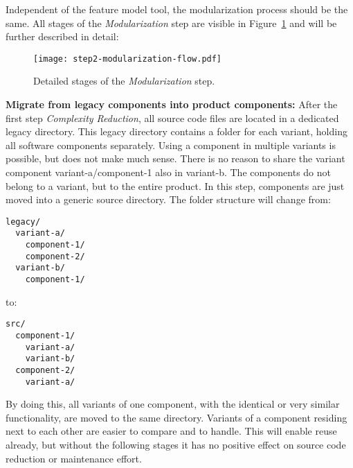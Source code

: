 Independent of the feature model tool, the modularization process should be the same.
All stages of the \textit{Modularization} step are visible in
Figure~\ref{fig:step2Modularization} and will be further described in detail:

\begin{figure}
  \centering
  \texttt{[image: step2-modularization-flow.pdf]}
  \caption{Detailed stages of the \textit{Modularization} step.}
  \label{fig:step2Modularization}
\end{figure}

\textbf{Migrate from legacy components into product components:} After the first
step \textit{Complexity Reduction}, all source code files are located in a
dedicated legacy directory. This legacy directory contains a folder for each
variant, holding all software components separately. Using a component in
multiple variants is possible, but does not make much sense. There is no reason
to share the variant component variant-a/component-1 also in variant-b. The
components do not belong to a variant, but to the entire product. In this step,
components are just moved into a generic source directory. The folder structure
will change from:
\begin{Verbatim}[frame=single,samepage=true]
legacy/
  variant-a/
    component-1/
    component-2/
  variant-b/
    component-1/
\end{Verbatim}
to:
\begin{Verbatim}[frame=single,samepage=true]
src/
  component-1/
    variant-a/
    variant-b/
  component-2/
    variant-a/
\end{Verbatim}
By doing this, all variants of one component, with the identical or very similar
functionality, are moved to the same directory. Variants of a component residing
next to each other are easier to compare and to handle. This will enable reuse
already, but without the following stages it has no positive effect on source
code reduction or maintenance effort.


